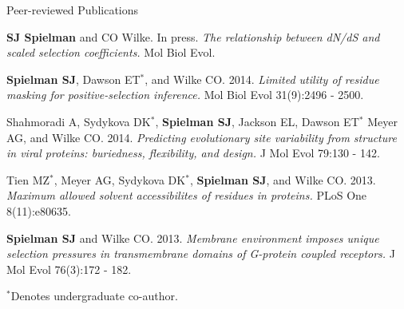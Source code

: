 \documentclass{resume} %
\begin{document}
\vspace*{0.5cm}
\begin{rSection}{Peer-reviewed Publications}
\vspace*{0.25cm}

\begin{etaremune}[leftmargin=1.5em]
	
\item 


\textbf{SJ Spielman} and CO Wilke. In press. \emph{The relationship between dN/dS and scaled selection coefficients.} Mol Biol Evol. \\

\item \textbf{Spielman SJ}, Dawson ET$^\ast$, and Wilke CO. 2014. \emph{Limited utility of residue masking for positive-selection inference.} Mol Biol Evol 31(9):2496 - 2500. \\


\item Shahmoradi A, Sydykova DK$^\ast$, \textbf{Spielman SJ}, Jackson EL, Dawson ET$^\ast$ Meyer AG, and Wilke CO. 2014. \emph{Predicting evolutionary site variability from structure in viral proteins: buriedness, flexibility, and design.} J Mol Evol 79:130 - 142. \\


\item Tien MZ$^\ast$, Meyer AG, Sydykova DK$^\ast$, \textbf{Spielman SJ}, and Wilke CO. 2013. \emph{Maximum allowed solvent accessibilites of residues in proteins.} PLoS One 8(11):e80635. \\


\item \textbf{Spielman SJ} and Wilke CO. 2013. \emph{Membrane environment imposes unique selection pressures in transmembrane domains of G-protein coupled receptors.} J Mol Evol 76(3):172 - 182. \\

\end{etaremune}

$^\ast$Denotes undergraduate co-author.


\end{rSection}







\end{document}
